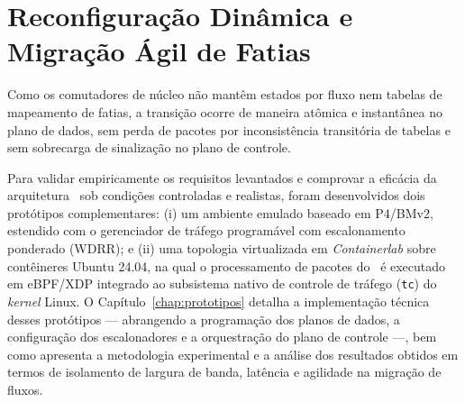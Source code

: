 \section{Reconfiguração Dinâmica e Migração Ágil de Fatias}
\label{sec:migracao_agil}



Como os comutadores de núcleo não mantêm estados por fluxo nem tabelas de mapeamento de fatias, a transição ocorre de maneira atômica e instantânea no plano de dados, sem perda de pacotes por inconsistência transitória de tabelas e sem sobrecarga de sinalização no plano de controle.

Para validar empiricamente os requisitos levantados e comprovar a eficácia da arquitetura \nome\ sob condições controladas e realistas, foram desenvolvidos dois protótipos complementares: (i) um ambiente emulado baseado em P4/BMv2, estendido com o gerenciador de tráfego programável com escalonamento ponderado (WDRR); e (ii) uma topologia virtualizada em \textit{Containerlab} sobre contêineres Ubuntu 24.04, na qual o processamento de pacotes do \nome\ é executado em eBPF/XDP integrado ao subsistema nativo de controle de tráfego (\texttt{tc}) do \textit{kernel} Linux. O Capítulo~\ref{chap:prototipos} detalha a implementação técnica desses protótipos --- abrangendo a programação dos planos de dados, a configuração dos escalonadores e a orquestração do plano de controle ---, bem como apresenta a metodologia experimental e a análise dos resultados obtidos em termos de isolamento de largura de banda, latência e agilidade na migração de fluxos.